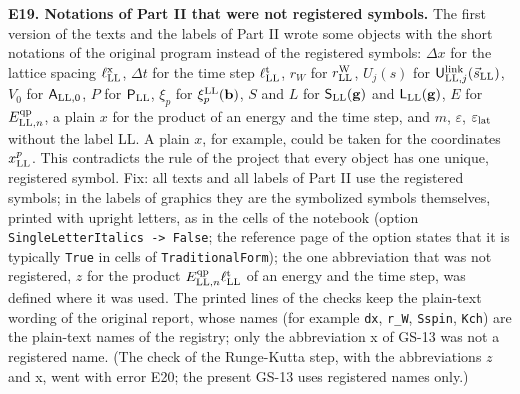 \documentclass[
  10pt,
]{article}
\begin{document}
\textbf{E19. Notations of Part II that were not registered symbols.} The
first version of the texts and the labels of Part II wrote some objects
with the short notations of the original program instead of the
registered symbols: \(\Delta x\) for the lattice spacing
\(\ell^{\rm x}_{\rm LL}\), \(\Delta t\) for the time step
\(\ell^{\rm t}_{\rm LL}\), \(r_W\) for \(r^{\rm W}_{\rm LL}\),
\(U_j(s)\) for \(\mathsf U^{\rm link}_{{\rm LL},j}(\vec s_{\rm LL})\),
\(V_0\) for \(\mathsf A_{{\rm LL},0}\), \(P\) for
\(\mathsf P_{\rm LL}\), \(\xi_p\) for \(\xi^{\rm LL}_p(\mathbf b)\),
\(S\) and \(L\) for \(\mathsf S_{\rm LL}(\mathbf g)\) and
\(\mathsf L_{\rm LL}(\mathbf g)\), \(E\) for
\(E^{\rm qp}_{{\rm LL},n}\), a plain \(x\) for the product of an energy
and the time step, and \(m\), \(\varepsilon\), \(\varepsilon_{\rm lat}\)
without the label LL. A plain \(x\), for example, could be taken for the
coordinates \(x^p_{\rm LL}\). This contradicts the rule of the project
that every object has one unique, registered symbol. Fix: all texts and
all labels of Part II use the registered symbols; in the labels of
graphics they are the symbolized symbols themselves, printed with
upright letters, as in the cells of the notebook (option
\texttt{SingleLetterItalics\ -\textgreater{}\ False}; the reference page
of the option states that it is typically \texttt{True} in cells of
\texttt{TraditionalForm}); the one abbreviation that was not registered,
\(z\) for the product \(E^{\rm qp}_{{\rm LL},n}\ell^{\rm t}_{\rm LL}\)
of an energy and the time step, was defined where it was used. The
printed lines of the checks keep the plain-text wording of the original
report, whose names (for example \texttt{dx}, \texttt{r\_W},
\texttt{Sspin}, \texttt{Kch}) are the plain-text names of the registry;
only the abbreviation x of GS-13 was not a registered name. (The check
of the Runge-Kutta step, with the abbreviations \(z\) and x, went with
error E20; the present GS-13 uses registered names only.)
\end{document}
